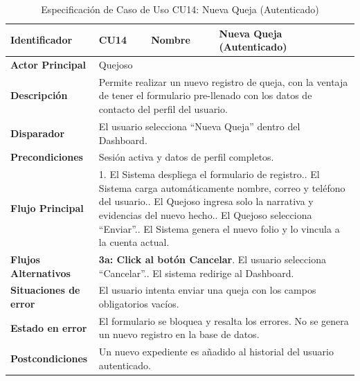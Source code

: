 \begingroup
\setlength{\parskip}{0pt}
\begin{longtable}{|p{3.5cm}|p{2cm}|p{2.5cm}|p{7cm}|}
\caption{Especificación de Caso de Uso CU14: Nueva Queja (Autenticado)}
\label{tab:cu14_nueva_queja} \\
\hline
\textbf{Identificador} & CU14 & \textbf{Nombre} & Nueva Queja (Autenticado) \\ \hline
\textbf{Actor Principal} & \multicolumn{3}{p{11.5cm}|}{Quejoso} \\ \hline
\textbf{Descripción} & \multicolumn{3}{p{11.5cm}|}{Permite realizar un nuevo registro de queja, con la ventaja de tener el formulario pre-llenado con los datos de contacto del perfil del usuario.} \\ \hline
\textbf{Disparador} & \multicolumn{3}{p{11.5cm}|}{El usuario selecciona ``Nueva Queja'' dentro del Dashboard.} \\ \hline
\textbf{Precondiciones} & \multicolumn{3}{p{11.5cm}|}{Sesión activa y datos de perfil completos.} \\ \hline
\textbf{Flujo Principal} & \multicolumn{3}{p{11.5cm}|}{1. El Sistema despliega el formulario de registro.\newline 2. El Sistema carga automáticamente nombre, correo y teléfono del usuario.\newline 3. El Quejoso ingresa solo la narrativa y evidencias del nuevo hecho.\newline 4. El Quejoso selecciona ``Enviar''.\newline 5. El Sistema genera el nuevo folio y lo vincula a la cuenta actual.} \\ \hline
\textbf{Flujos Alternativos} & \multicolumn{3}{p{11.5cm}|}{\textbf{3a: Click al botón Cancelar}\newline 1. El usuario selecciona ``Cancelar''.\newline 2. El sistema redirige al Dashboard.} \\ \hline
\textbf{Situaciones de error} & \multicolumn{3}{p{11.5cm}|}{El usuario intenta enviar una queja con los campos obligatorios vacíos.} \\ \hline
\textbf{Estado en error} & \multicolumn{3}{p{11.5cm}|}{El formulario se bloquea y resalta los errores. No se genera un nuevo registro en la base de datos.} \\ \hline
\textbf{Postcondiciones} & \multicolumn{3}{p{11.5cm}|}{Un nuevo expediente es añadido al historial del usuario autenticado.} \\ \hline
\end{longtable}
\endgroup

